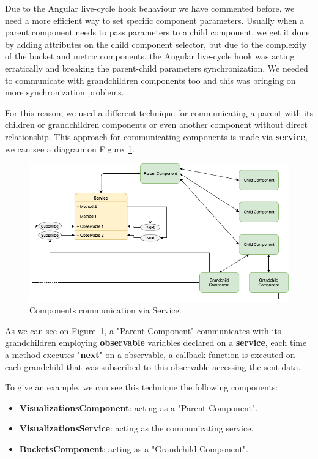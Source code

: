 \documentclass[a4paper, 12pt, english]{book}
\begin{document}
Due to the Angular live-cycle hook behaviour we have commented before, we need a more efficient way to set specific component parameters. Usually when a parent component needs to pass parameters to a child component, we get it done by adding attributes on the child component selector, but due to the complexity of the bucket and metric components, the Angular live-cycle hook was acting erratically and breaking the parent-child parameters synchronization. We needed to communicate with grandchildren components too and this was bringing on more synchronization problems.

For this reason, we used a different technique for communicating a parent with its children or grandchildren components or even another component without direct relationship. This approach for communicating components is made via \textbf{service}, we can see a diagram on Figure~\ref{fig:parent-child-via-service}.
\begin{figure}
  \centering
  \includegraphics[width=13cm, keepaspectratio]{img/parent-child-via-service.png}
  \caption{Components communication via Service.}
  \label{fig:parent-child-via-service}
\end{figure}

As we can see on Figure~\ref{fig:parent-child-via-service}, a "Parent Component" communicates with its grandchildren employing \textbf{observable} variables declared on a \textbf{service}, each time a method executes "\textbf{next}" on a observable, a callback function is executed on each grandchild that was subscribed to this observable accessing the sent data.

To give an example, we can see this technique the following components:
\begin{itemize}
    \item \textbf{VisualizationsComponent}: acting as a "Parent Component".
    \item \textbf{VisualizationsService}: acting as the communicating service.
    \item \textbf{BucketsComponent}: acting as a "Grandchild Component".
\end{itemize}
\end{document}
